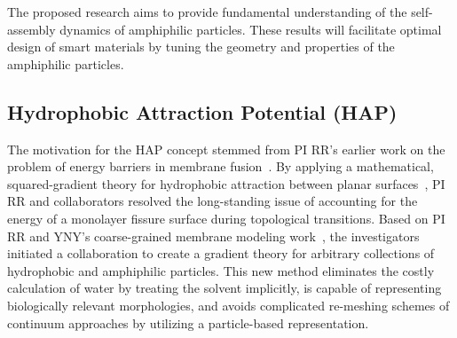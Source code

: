 %
%
The proposed research aims to provide fundamental understanding of the self-assembly dynamics of amphiphilic particles. These results will facilitate optimal design of smart materials by
tuning the geometry and properties of the amphiphilic particles.


\subsection{Hydrophobic Attraction Potential (HAP)}
\label{sec:HAP}
The motivation for the HAP concept stemmed from PI RR's earlier work on
the problem of energy barriers in membrane
fusion~\cite{RyKlYaCo16,Chetal16}. By applying a mathematical, squared-gradient
theory for hydrophobic attraction between planar
surfaces~\cite{Eriksson1989,Lum1999,Menshikov2017,Marcelja1977}, PI RR
and collaborators resolved the long-standing issue of accounting for the
energy of a monolayer fissure surface during topological transitions.
Based on PI RR and YNY's coarse-grained membrane modeling
work~\cite{Fu2017}, the investigators initiated a collaboration to
create a gradient theory for arbitrary collections of hydrophobic and
amphiphilic particles. This new method eliminates the costly calculation
of water by treating the solvent implicitly, is capable of representing
biologically relevant morphologies, and avoids complicated
re-meshing schemes of continuum approaches by utilizing a particle-based
representation.


